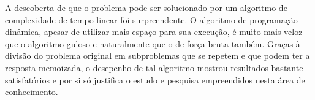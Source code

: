 \documentclass[a4paper,12pt,titlepage]{article}
\begin{document}
A descoberta de que o problema pode ser solucionado por um algoritmo de complexidade de tempo linear foi surpreendente. O algoritmo de programação dinâmica, apesar de utilizar mais espaço para sua execução, é muito mais veloz que o algoritmo guloso e naturalmente que o de força-bruta também. Graças à divisão do problema original em subproblemas que se repetem e que podem ter a resposta memoizada, o desepenho de tal algoritmo mostrou resultados bastante satisfatórios e por si só justifica o estudo e pesquisa empreendidos nesta área de conhecimento.

\begin{figure}[H]
     \centering
     \caption{}
     \label{bsp}
\end{figure}



\newpage
\end{document}

